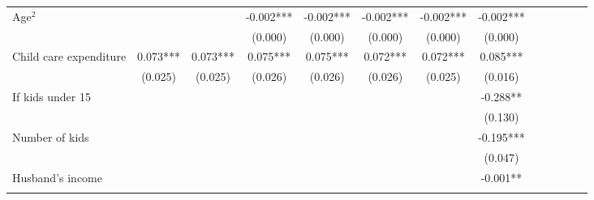\begin{center}
\begin{table}[th]
{\begin{tabular}{lcccccccccccc}
\multicolumn{1}{l}{Age$^2$} &
  \multicolumn{1}{c}{} &
  \multicolumn{1}{c}{} &
  \multicolumn{1}{c}{-0.002***} &
  \multicolumn{1}{c}{-0.002***} &
  \multicolumn{1}{c}{-0.002***} &
  \multicolumn{1}{c}{-0.002***} &
  \multicolumn{1}{c}{-0.002***} \\
\multicolumn{1}{l}{} &
  \multicolumn{1}{c}{} &
  \multicolumn{1}{c}{} &
  \multicolumn{1}{c}{(0.000)} &
  \multicolumn{1}{c}{(0.000)} &
  \multicolumn{1}{c}{(0.000)} &
  \multicolumn{1}{c}{(0.000)} &
  \multicolumn{1}{c}{(0.000)} \\
\multicolumn{1}{l}{Child care expenditure} &
  \multicolumn{1}{c}{0.073***} &
  \multicolumn{1}{c}{0.073***} &
  \multicolumn{1}{c}{0.075***} &
  \multicolumn{1}{c}{0.075***} &
  \multicolumn{1}{c}{0.072***} &
  \multicolumn{1}{c}{0.072***} &
  \multicolumn{1}{c}{0.085***} \\
\multicolumn{1}{l}{} &
  \multicolumn{1}{c}{(0.025)} &
  \multicolumn{1}{c}{(0.025)} &
  \multicolumn{1}{c}{(0.026)} &
  \multicolumn{1}{c}{(0.026)} &
  \multicolumn{1}{c}{(0.026)} &
  \multicolumn{1}{c}{(0.025)} &
  \multicolumn{1}{c}{(0.016)} \\
\multicolumn{1}{l}{If kids under 15} &
  \multicolumn{1}{c}{} &
  \multicolumn{1}{c}{} &
  \multicolumn{1}{c}{} &
  \multicolumn{1}{c}{} &
  \multicolumn{1}{c}{} &
  \multicolumn{1}{c}{} &
  \multicolumn{1}{c}{-0.288**} \\
\multicolumn{1}{l}{} &
  \multicolumn{1}{c}{} &
  \multicolumn{1}{c}{} &
  \multicolumn{1}{c}{} &
  \multicolumn{1}{c}{} &
  \multicolumn{1}{c}{} &
  \multicolumn{1}{c}{} &
  \multicolumn{1}{c}{(0.130)} \\
\multicolumn{1}{l}{Number of kids} &
  \multicolumn{1}{c}{} &
  \multicolumn{1}{c}{} &
  \multicolumn{1}{c}{} &
  \multicolumn{1}{c}{} &
  \multicolumn{1}{c}{} &
  \multicolumn{1}{c}{} &
  \multicolumn{1}{c}{-0.195***} \\
\multicolumn{1}{l}{} &
  \multicolumn{1}{c}{} &
  \multicolumn{1}{c}{} &
  \multicolumn{1}{c}{} &
  \multicolumn{1}{c}{} &
  \multicolumn{1}{c}{} &
  \multicolumn{1}{c}{} &
  \multicolumn{1}{c}{(0.047)} \\
\multicolumn{1}{l}{Husband's income} &
  \multicolumn{1}{c}{} &
  \multicolumn{1}{c}{} &
  \multicolumn{1}{c}{} &
  \multicolumn{1}{c}{} &
  \multicolumn{1}{c}{} &
  \multicolumn{1}{c}{} &
  \multicolumn{1}{c}{-0.001**} \\
\multicolumn{1}{l}{} &
  \multicolumn{1}{c}{} &
  \multicolumn{1}{c}{} &
  \multicolumn{1}{c}{} &
  \multicolumn{1}{c}{} &
  \multicolumn{1}{c}{} &
  \multicolumn{1}{c}{} &

\end{tabular}}
\end{table}
\end{center}
